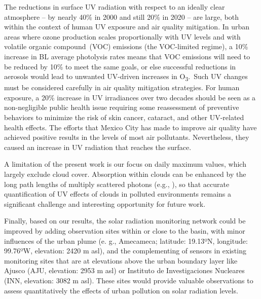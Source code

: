 \documentclass[journal=jacsat,manuscript=article]{achemso}
\begin{document}
The reductions in surface UV radiation with respect to an ideally clear
atmosphere -- by nearly 40\% in 2000 and still 20\% in 2020 -- are
large, both within the context of human UV exposure and air quality
mitigation. In urban areas where ozone production scales proportionally
with UV levels and with volatile organic compound~(VOC) emissions (the
VOC-limited regime), a 10\% increase in BL average photolysis rates
means that VOC emissions will need to be reduced by 10\% to meet the
same goals, or else successful reductions in aerosols would lead to
unwanted UV-driven increases in O\textsubscript{3}.~Such UV changes must
be considered carefully in air quality mitigation strategies. For human
exposure, a 20\% increase in UV irradiances over two decades should be
seen as a non-negligible public health issue requiring some reassessment
of preventive behaviors to minimize the risk of skin cancer, cataract,
and other UV-related health effects. The efforts that Mexico City has
made to improve air quality have achieved positive results in the levels
of most air pollutants. Nevertheless, they caused an increase in UV
radiation that reaches the surface.

A limitation of the present work is our focus on daily maximum values,
which largely exclude cloud cover. Absorption within clouds can be
enhanced by the long path lengths of multiply scattered photons (e.g.,
\citet{Mayer_1998}), so that accurate quantification of UV
effects of clouds in polluted environments remains a significant
challenge and interesting opportunity for future work.

Finally, based on our results, the solar radiation monitoring network could be
improved by adding observation sites within or close to the basin, with minor
influences of the urban plume (e. g., Amecameca; latitude: 19.13ºN, longitude: 99.76ºW, elevation: 2420 m asl),
and the complementing of sensors in existing monitoring sites that are at elevations above the urban boundary
layer like Ajusco (AJU, elevation: 2953 m asl) or Instituto de Investigaciones Nucleares (INN, elevation: 3082 m asl).
These sites would provide valuable observations to assess quantitatively the effects of urban pollution on solar radiation levels.
\end{document}
